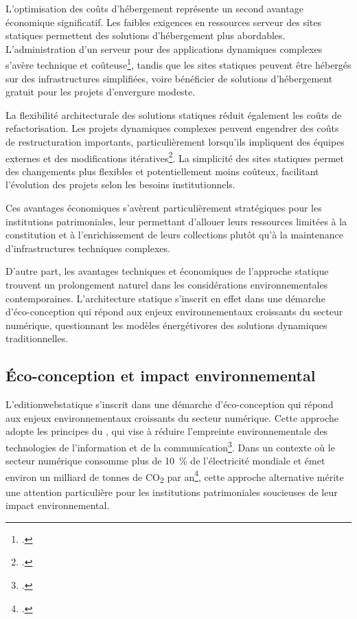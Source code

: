 L'optimisation des coûts d'hébergement représente un second avantage économique significatif. Les faibles exigences en ressources serveur des sites statiques permettent des solutions d'hébergement plus abordables. L'administration d'un serveur pour des applications dynamiques complexes s'avère technique et coûteuse\footcite{otooleSustainableWebEcosystem2013}, tandis que les sites statiques peuvent être hébergés sur des infrastructures simplifiées, voire bénéficier de solutions d'hébergement gratuit pour les projets d'envergure modeste.

La flexibilité architecturale des solutions statiques réduit également les coûts de refactorisation. Les projets dynamiques complexes peuvent engendrer des coûts de restructuration importants, particulièrement lorsqu'ils impliquent des équipes externes et des modifications itératives\footcite{gantierRetroingenierieWebdocumentaireFind2020}. La simplicité des sites statiques permet des changements plus flexibles et potentiellement moins coûteux, facilitant l'évolution des projets selon les besoins institutionnels.

Ces avantages économiques s'avèrent particulièrement stratégiques pour les institutions patrimoniales, leur permettant d'allouer leurs ressources limitées à la constitution et à l'enrichissement de leurs collections plutôt qu'à la maintenance d'infrastructures techniques complexes.

D'autre part, les avantages techniques et économiques de l'approche statique trouvent un prolongement naturel dans les considérations environnementales contemporaines. L'architecture statique s'inscrit en effet dans une démarche d'éco-conception qui répond aux enjeux environnementaux croissants du secteur numérique, questionnant les modèles énergétivores des solutions dynamiques traditionnelles.

\subsection{Éco-conception et impact environnemental}

L'\gls{editionwebstatique} s'inscrit dans une démarche d'éco-conception qui répond aux enjeux environnementaux croissants du secteur numérique. Cette approche adopte les principes du , qui vise à réduire l'empreinte environnementale des technologies de l'information et de la communication\footcite{novaLowtechNumeriqueAux2020}. Dans un contexte où le secteur numérique consomme plus de 10~\% de l'électricité mondiale et émet environ un milliard de tonnes de CO\textsubscript{2} par an\footcite{bihouixHighTechOuLowTech2022}, cette approche alternative mérite une attention particulière pour les institutions patrimoniales soucieuses de leur impact environnemental.


